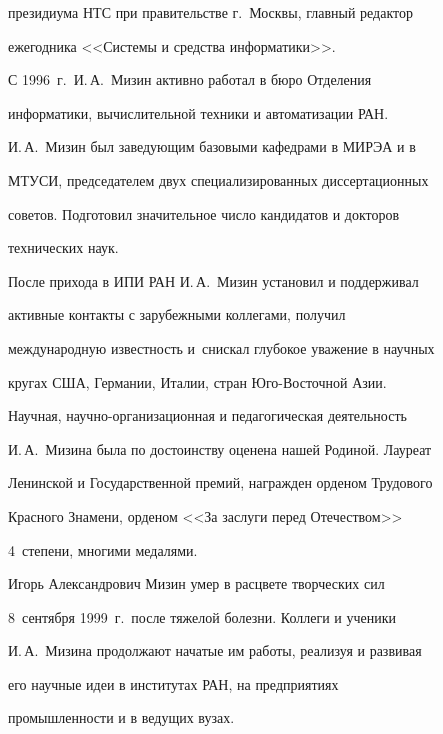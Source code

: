 президиума НТС при правительстве г.~Москвы, главный редактор 

ежегодника <<Системы и средства информатики>>.







    

   С 1996~г.\ И.\,А.~Мизин активно работал в бюро Отделения 

информатики, вычислительной техники и автоматизации РАН.

   

   И.\,А.~Мизин был заведующим базовыми кафедрами в МИРЭА и в 

МТУСИ, председателем двух специализированных диссертационных 

советов. Подготовил значительное число кандидатов и докторов 

технических наук. 

   

   После прихода в ИПИ РАН И.\,А.~Мизин установил и поддерживал 

активные контакты с зарубежными коллегами, получил 

международную известность и~снискал глубокое уважение в научных 

кругах США, Германии, Италии, стран Юго-Вос\-точ\-ной Азии. 

   

   Научная, научно-организационная и педагогическая деятельность 

И.\,А.~Мизина была по достоинству оценена нашей Родиной. Лауреат 

Ленинской и Государственной премий, награжден орденом Трудового 

Красного Знамени, орденом <<За заслуги перед Отечеством>> 

4~степени, многими медалями.

   

   Игорь Александрович Мизин умер в расцвете творческих сил 

8~сентября 1999~г.\ после тяжелой болезни. Коллеги и ученики 

И.\,А.~Мизина продолжают начатые им работы, реализуя и развивая 

его научные идеи в институтах РАН, на предприятиях 

промышленности и в ведущих вузах.




